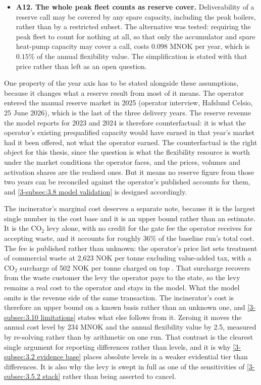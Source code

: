 \begin{itemize}
    \item \textbf{A12. The whole peak fleet counts as reserve cover.} Deliverability of a reserve call may be covered by any spare capacity, including the peak boilers, rather than by a restricted subset. The alternative was tested: requiring the peak fleet to count for nothing at all, so that only the accumulator and spare heat-pump capacity may cover a call, costs 0.098 MNOK per year, which is $0.15\%$ of the annual flexibility value. The simplification is stated with that price rather than left as an open question.
\end{itemize}

One property of the year axis has to be stated alongside these assumptions, because it changes what a reserve result from most of it means. The operator entered the manual reserve market in 2025 (operator interview, Hafslund Celsio, 25 June 2026), which is the last of the three delivery years. The reserve revenue the model reports for 2023 and 2024 is therefore counterfactual: it is what the operator's existing prequalified capacity would have earned in that year's market had it been offered, not what the operator earned. The counterfactual is the right object for this thesis, since the question is what the flexibility resource is worth under the market conditions the operator faces, and the prices, volumes and activation shares are the realised ones. But it means no reserve figure from those two years can be reconciled against the operator's published accounts for them, and \autoref{3-subsec:3.8 model validation} is designed accordingly.

The incinerator's marginal cost deserves a separate note, because it is the largest single number in the cost base and it is an upper bound rather than an estimate. It is the CO$_2$ levy alone, with no credit for the gate fee the operator receives for accepting waste, and it accounts for roughly $36\%$ of the baseline run's total cost. The fee is published rather than unknown: the operator's price list sets treatment of commercial waste at 2{,}623 NOK per tonne excluding value-added tax, with a CO$_2$ surcharge of 502 NOK per tonne charged on top \cite{hafslund_priser_2024}. That surcharge recovers from the waste customer the levy the operator pays to the state, so the levy remains a real cost to the operator and stays in the model. What the model omits is the revenue side of the same transaction. The incinerator's cost is therefore an upper bound on a known basis rather than an unknown one, and \autoref{3-subsec:3.10 limitations} states what else follows from it. Zeroing it moves the annual cost level by 234 MNOK and the annual flexibility value by 2.5, measured by re-solving rather than by arithmetic on one run. That contrast is the clearest single argument for reporting differences rather than levels, and it is why \autoref{3-subsec:3.2 evidence base} places absolute levels in a weaker evidential tier than differences. It is also why the levy is swept in full as one of the sensitivities of \autoref{3-subsec:3.5.2 stack} rather than being asserted to cancel.

